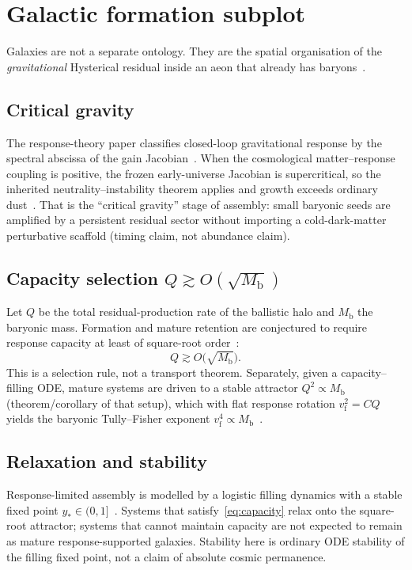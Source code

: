 \documentclass[11pt]{article}
\newcommand{\Mb}{M_{\mathrm{b}}}
\newcommand{\vf}{v_{\mathrm{f}}}
\begin{document}
\section{Galactic formation subplot}
\label{sec:galactic}
Galaxies are not a separate ontology.
They are the spatial organisation of the \emph{gravitational} Hysterical residual
inside an aeon that already has baryons~\cite{boyd2026galactic,boyd2026response}.

\subsection{Critical gravity}
The response-theory paper classifies closed-loop gravitational response by the
spectral abscissa of the gain Jacobian~\cite{boyd2026response}.
When the cosmological matter--response coupling is positive, the frozen early-universe
Jacobian is supercritical, so the inherited neutrality--instability theorem
applies and growth exceeds ordinary dust~\cite{boyd2026early}.
That is the ``critical gravity'' stage of assembly: small baryonic seeds are
amplified by a persistent residual sector without importing a cold-dark-matter
perturbative scaffold (timing claim, not abundance claim).

\subsection{\texorpdfstring{Capacity selection $Q\gtrsim O(\sqrt{\Mb})$}{Capacity selection}}
Let $Q$ be the total residual-production rate of the ballistic halo and $\Mb$ the
baryonic mass.
Formation and mature retention are conjectured to require response capacity at
least of square-root order~\cite{boyd2026galactic}:
\begin{equation}
\label{eq:capacity}
\boxed{Q\gtrsim O\bigl(\sqrt{\Mb}\bigr)}.
\end{equation}
This is a selection rule, not a transport theorem.
Separately, given a capacity--filling ODE, mature systems are driven to a stable
attractor $Q^{2}\propto\Mb$ (theorem/corollary of that setup), which with flat
response rotation $\vf^{2}=CQ$ yields the baryonic Tully--Fisher exponent
$\vf^{4}\propto\Mb$~\cite{boyd2026galactic,mcgaugh2012}.

\subsection{Relaxation and stability}
Response-limited assembly is modelled by a logistic filling dynamics with a stable
fixed point $y_*\in(0,1]$~\cite{boyd2026galactic}.
Systems that satisfy~\eqref{eq:capacity} relax onto the square-root attractor;
systems that cannot maintain capacity are not expected to remain as mature
response-supported galaxies.
Stability here is ordinary ODE stability of the filling fixed point, not a claim
of absolute cosmic permanence.
\end{document}
